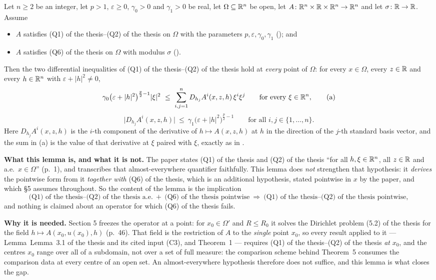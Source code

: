 \begin{lemma}
Let $n\ge2$ be an integer, let $p>1$, $\varepsilon\ge0$, $\gamma_0>0$ and
$\gamma_1>0$ be real, let $\Omega\subseteq\mathbb{R}^n$ be open, let
$A\colon\mathbb{R}^n\times\mathbb{R}\times\mathbb{R}^n\to\mathbb{R}^n$ and let $\sigma\colon\mathbb{R}\to\mathbb{R}$.  Assume
\begin{itemize}
\item $A$ satisfies (Q1) of the thesis--(Q2) of the thesis on $\Omega$ with the parameters
  $p,\varepsilon,\gamma_0,\gamma_1$ (); and
\item $A$ satisfies (Q6) of the thesis on $\Omega$ with modulus $\sigma$
  ().
\end{itemize}
Then the two differential inequalities of (Q1) of the thesis--(Q2) of the thesis hold at
\emph{every} point of $\Omega$: for every $x\in\Omega$, every $z\in\mathbb{R}$ and every
$h\in\mathbb{R}^n$ with $\varepsilon+|h|^2\ne0$,
\[
\gamma_0\bigl(\varepsilon+|h|^2\bigr)^{\frac p2-1}|\xi|^2
\ \le\ \sum_{i,j=1}^nD_{h_j}A^i(x,z,h)\,\xi^i\xi^j
\qquad\text{for every }\xi\in\mathbb{R}^n ,
\tag{a}
\]
\[
\bigl|D_{h_j}A^i(x,z,h)\bigr|
\ \le\ \gamma_1\bigl(\varepsilon+|h|^2\bigr)^{\frac p2-1}
\qquad\text{for all }i,j\in\{1,\dots,n\} .
\tag{b}
\]
Here $D_{h_j}A^i(x,z,h)$ is the $i$-th component of the derivative of
$h\mapsto A(x,z,h)$ at $h$ in the direction of the $j$-th standard basis vector,
and the sum in (a) is the value of that derivative at $\xi$ paired with $\xi$,
exactly as in .

\medskip
\noindent\textbf{What this lemma is, and what it is not.}  The paper states
(Q1) of the thesis and (Q2) of the thesis ``for all $h,\xi\in\mathbb{R}^n$, all $z\in\mathbb{R}$ and
a.e.\ $x\in\Omega$'' (p.~1), and  transcribes that
almost-everywhere quantifier faithfully.  This lemma does \emph{not} strengthen
that hypothesis: it \emph{derives} the pointwise form from it \emph{together
with} (Q6) of the thesis, which is an additional hypothesis, stated pointwise in $x$
by the paper, and which \S5 assumes throughout.  So the content of the lemma is
the implication
\[
\text{(Q1) of the thesis--(Q2) of the thesis a.e.}\ +\ \text{(Q6) of the thesis pointwise}
\ \Longrightarrow\ \text{(Q1) of the thesis--(Q2) of the thesis pointwise},
\]
and nothing is claimed about an operator for which (Q6) of the thesis fails.

\noindent\textbf{Why it is needed.}  Section 5 freezes the operator at a point:
for $x_0\in\Omega'$ and $R\le R_0$ it solves the Dirichlet problem
(5.2) of the thesis for the field $h\mapsto A(x_0,u(x_0),h)$ (p.~46).  That field is
the restriction of $A$ to the \emph{single} point $x_0$, so every result applied
to it --- Lemma~Lemma~3.1 of the thesis and its cited input (C3), and Theorem~1 ---
requires (Q1) of the thesis--(Q2) of the thesis \emph{at} $x_0$, and the centres $x_0$
range over all of a subdomain, not over a set of full measure: the comparison
scheme behind Theorem~5 consumes the comparison data at every centre of an open
set.  An almost-everywhere hypothesis therefore does not suffice, and this
lemma is what closes the gap.


\end{lemma}
